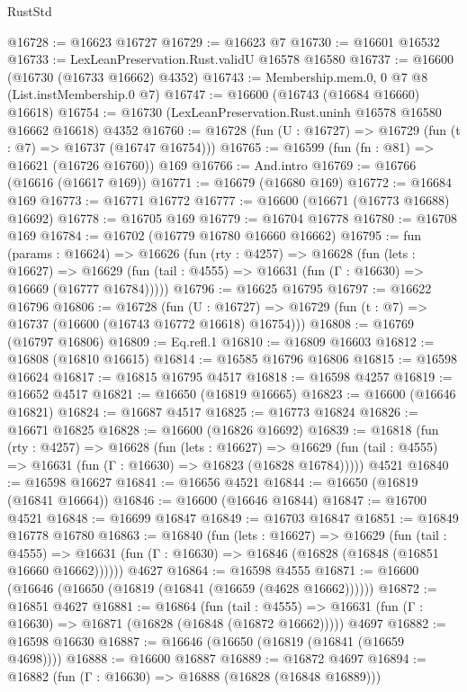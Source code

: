 \begin{lexlean}{RustStd}
\begin{coremodule}
@16728 := @16623 @16727
@16729 := @16623 @7
@16730 := @16601 @16532
@16733 := LexLeanPreservation.Rust.validU @16578 @16580
@16737 := @16600 (@16730 (@16733 @16662) @4352)
@16743 := Membership.mem.{0, 0} @7 @8 (List.instMembership.{0} @7)
@16747 := @16600 (@16743 (@16684 @16660) @16618)
@16754 := @16730 (LexLeanPreservation.Rust.uninh @16578 @16580 @16662 @16618) @4352
@16760 := @16728 (fun (U : @16727) => @16729 (fun (t : @7) => @16737 (@16747 @16754)))
@16765 := @16599 (fun (fn : @81) => @16621 (@16726 @16760)) @169
@16766 := And.intro
@16769 := @16766 (@16616 (@16617 @169))
@16771 := @16679 (@16680 @169)
@16772 := @16684 @169
@16773 := @16771 @16772
@16777 := @16600 (@16671 (@16773 @16688) @16692)
@16778 := @16705 @169
@16779 := @16704 @16778
@16780 := @16708 @169
@16784 := @16702 (@16779 @16780 @16660 @16662)
@16795 := fun (params : @16624) =>
  @16626
    (fun (rty : @4257) =>
    @16628
      (fun (lets : @16627) =>
      @16629 (fun (tail : @4555) => @16631 (fun (Γ : @16630) => @16669 (@16777 @16784)))))
@16796 := @16625 @16795
@16797 := @16622 @16796
@16806 := @16728
    (fun (U : @16727) => @16729 (fun (t : @7) => @16737 (@16600 (@16743 @16772 @16618) @16754)))
@16808 := @16769 (@16797 @16806)
@16809 := Eq.refl.{1}
@16810 := @16809 @16603
@16812 := @16808 (@16810 @16615)
@16814 := @16585 @16796 @16806
@16815 := @16598 @16624
@16817 := @16815 @16795 @4517
@16818 := @16598 @4257
@16819 := @16652 @4517
@16821 := @16650 (@16819 @16665)
@16823 := @16600 (@16646 @16821)
@16824 := @16687 @4517
@16825 := @16773 @16824
@16826 := @16671 @16825
@16828 := @16600 (@16826 @16692)
@16839 := @16818
    (fun (rty : @4257) =>
    @16628
      (fun (lets : @16627) =>
      @16629 (fun (tail : @4555) => @16631 (fun (Γ : @16630) => @16823 (@16828 @16784)))))
    @4521
@16840 := @16598 @16627
@16841 := @16656 @4521
@16844 := @16650 (@16819 (@16841 @16664))
@16846 := @16600 (@16646 @16844)
@16847 := @16700 @4521
@16848 := @16699 @16847
@16849 := @16703 @16847
@16851 := @16849 @16778 @16780
@16863 := @16840
    (fun (lets : @16627) =>
    @16629
      (fun (tail : @4555) =>
      @16631 (fun (Γ : @16630) => @16846 (@16828 (@16848 (@16851 @16660 @16662))))))
    @4627
@16864 := @16598 @4555
@16871 := @16600 (@16646 (@16650 (@16819 (@16841 (@16659 (@4628 @16662))))))
@16872 := @16851 @4627
@16881 := @16864
    (fun (tail : @4555) => @16631 (fun (Γ : @16630) => @16871 (@16828 (@16848 (@16872 @16662)))))
    @4697
@16882 := @16598 @16630
@16887 := @16646 (@16650 (@16819 (@16841 (@16659 @4698))))
@16888 := @16600 @16887
@16889 := @16872 @4697
@16894 := @16882 (fun (Γ : @16630) => @16888 (@16828 (@16848 @16889)))

\end{coremodule}
\end{lexlean}
